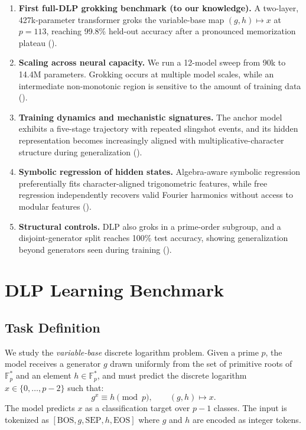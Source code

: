 \documentclass[11pt]{article}
\newcommand{\Fps}{\mathbb{F}_p^*}
\begin{document}
\begin{enumerate}[leftmargin=*]
    \item \textbf{First full-DLP grokking benchmark (to our knowledge).} A two-layer, 427k-parameter transformer groks the variable-base map $(g,h)\mapsto x$ at $p=113$, reaching 99.8\% held-out accuracy after a pronounced memorization plateau ().

    \item \textbf{Scaling across neural capacity.} We run a 12-model sweep from 90k to 14.4M parameters. Grokking occurs at multiple model scales, while an intermediate non-monotonic region is sensitive to the amount of training data ().

    \item \textbf{Training dynamics and mechanistic signatures.} The anchor model exhibits a five-stage trajectory with repeated slingshot events, and its hidden representation becomes increasingly aligned with multiplicative-character structure during generalization ().

    \item \textbf{Symbolic regression of hidden states.} Algebra-aware symbolic regression preferentially fits character-aligned trigonometric features, while free regression independently recovers valid Fourier harmonics without access to modular features ().

    \item \textbf{Structural controls.} DLP also groks in a prime-order subgroup, and a disjoint-generator split reaches 100\% test accuracy, showing generalization beyond generators seen during training ().
\end{enumerate}


\section{DLP Learning Benchmark}
\label{sec:benchmark}

\subsection{Task Definition}

We study the \emph{variable-base} discrete logarithm problem. Given a prime $p$, the model receives a generator $g$ drawn uniformly from the set of primitive roots of $\Fps$ and an element $h \in \Fps$, and must predict the discrete logarithm $x \in \{0, \ldots, p-2\}$ such that:
\begin{equation}
    g^x \equiv h \pmod{p}, \qquad (g, h) \mapsto x.
\end{equation}
The model predicts $x$ as a classification target over $p - 1$ classes. The input is tokenized as $[\mathrm{BOS}, g, \mathrm{SEP}, h, \mathrm{EOS}]$ where $g$ and $h$ are encoded as integer tokens.
\end{document}
